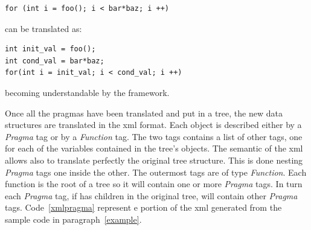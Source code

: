 \documentclass[a4paper,11pt,oneside]{book}
\begin{document}
\begin{lstlisting}[language=CCC]
for (int i = foo(); i < bar*baz; i ++)
\end{lstlisting}
can be translated as:

\begin{lstlisting}[language=CCC]
int init_val = foo();
int cond_val = bar*baz;
for(int i = init_val; i < cond_val; i ++)  
\end{lstlisting}
becoming understandable by the framework.

Once all the pragmas have been translated and put in a tree, the new data structures are translated in the xml format. Each object is described either by a \emph{Pragma} tag or by a \emph{Function} tag. The two tags contains a list of other tags, one for  each of the variables contained in the tree’s objects. The semantic of the xml allows also to translate perfectly the original tree structure. This is done nesting \emph{Pragma} tags one inside the other. The outermost tags are of type \emph{Function}. Each function is the root of a tree so it will contain one or more \emph{Pragma} tags. In turn each \emph{Pragma} tag, if has children in the original tree, will contain other \emph{Pragma} tags. Code~\ref{xmlpragma} represent e portion of the xml generated from the sample code in paragraph~\ref{example}.
\end{document}
